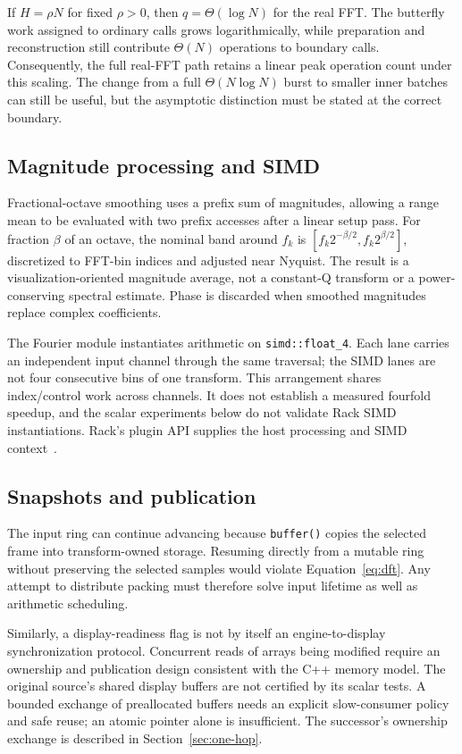 \documentclass[11pt,letterpaper]{article}
\newcommand{\code}[1]{\texttt{#1}}
\begin{document}
If $H=\rho N$ for fixed $\rho>0$, then $q=\Theta(\log N)$ for the real FFT.
The butterfly work assigned to ordinary calls grows logarithmically, while
preparation and reconstruction still contribute $\Theta(N)$ operations to
boundary calls. Consequently, the full real-FFT path retains a linear peak
operation count under this scaling. The change from a full
$\Theta(N\log N)$ burst to smaller inner batches can still be useful, but the
asymptotic distinction must be stated at the correct boundary.

\subsection{Magnitude processing and SIMD}
Fractional-octave smoothing uses a prefix sum of magnitudes, allowing a range
mean to be evaluated with two prefix accesses after a linear setup pass. For
fraction $\beta$ of an octave, the nominal band around $f_k$ is
$[f_k2^{-\beta/2},f_k2^{\beta/2}]$, discretized to FFT-bin indices and adjusted
near Nyquist. The result is a visualization-oriented magnitude average, not a
constant-Q transform or a power-conserving spectral estimate. Phase is discarded
when smoothed magnitudes replace complex coefficients.

The Fourier module instantiates arithmetic on \code{simd::float\_4}. Each lane
carries an independent input channel through the same traversal; the SIMD
lanes are not four consecutive bins of one transform. This arrangement
shares index/control work across channels. It does not establish a measured
fourfold speedup, and the scalar experiments below do not validate Rack SIMD
instantiations. Rack's plugin API supplies the host processing and SIMD
context~\cite{rack}.

\subsection{Snapshots and publication}
The input ring can continue advancing because \code{buffer()} copies the
selected frame into transform-owned storage. Resuming directly from a mutable
ring without preserving the selected samples would violate
Equation~\eqref{eq:dft}. Any attempt to distribute packing must therefore solve
input lifetime as well as arithmetic scheduling.

Similarly, a display-readiness flag is not by itself an engine-to-display
synchronization protocol. Concurrent reads of arrays being modified require an
ownership and publication design consistent with the C++ memory model. The
original source's shared display buffers are not certified by its scalar tests.
A bounded exchange of preallocated buffers needs an explicit slow-consumer
policy and safe reuse; an atomic pointer alone is insufficient. The successor's
ownership exchange is described in Section~\ref{sec:one-hop}.
\end{document}
